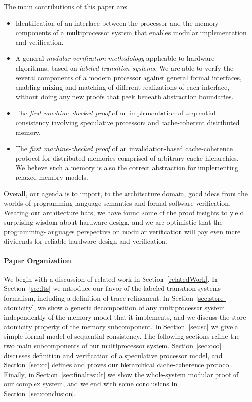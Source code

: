 The main contributions of this paper are:
\vspace{-.3cm}
\begin{itemize} 
\item Identification of an interface between the processor and the memory
components of a multiprocessor system that enables modular implementation and
verification.

\item A general \emph{modular verification methodology} applicable to hardware
algorithms, based on \emph{labeled transition systems}.  We are able to verify
the several components of a modern processor against general formal interfaces,
enabling mixing and matching of different realizations of each interface,
without doing any new proofs that peek beneath abstraction boundaries.

\item The \emph{first machine-checked proof} of an implementation of sequential
consistency involving speculative processors and cache-coherent distributed
memory.

\item The \emph{first machine-checked proof} of an invalidation-based
cache-coherence protocol for distributed memories comprised of arbitrary cache
hierarchies. We believe such a memory is also the correct abstraction for
implementing relaxed memory models.
\end{itemize}

Overall, our agenda is to import, to the architecture domain, good ideas from
the worlds of programming-language semantics and formal software verification.
Wearing our architecture hats, we have found some of the proof insights to yield
surprising wisdom about hardware design, and we are optimistic that the
programming-languages perspective on modular verification will pay even more
dividends for reliable hardware design and verification.

\paragraph{Paper Organization:} We begin with a discussion of related work in
Section~\ref{relatedWork}. In Section~\ref{sec:lts} we introduce our flavor of
the labeled transition systems formalism, including a definition of trace
refinement. In Section~\ref{sec:store-atomicity}, we show a generic
decomposition of any multiprocessor system independently of the memory model
that it implements, and we discuss the store-atomicity property of the memory
subcomponent. In Section~\ref{sec:sc} we give a simple formal model of
sequential consistency.  The following sections refine the two main
subcomponents of our multiprocessor system.  Section~\ref{sec:ooo} discusses
definition and verification of a speculative processor model, and
Section~\ref{sec:cc} defines and proves our hierarchical cache-coherence
protocol.  Finally, in Section~\ref{sec:finalresult} we show the whole-system
modular proof of our complex system, and we end with some conclusions in
Section~\ref{sec:conclusion}.

